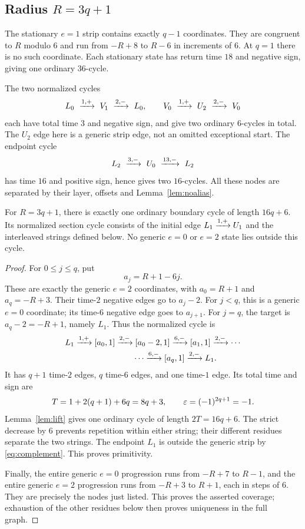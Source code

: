 \subsection{Radius \texorpdfstring{\(R=3q+1\)}{R=3q+1}}

The stationary $e=1$ strip contains exactly $q-1$ coordinates.
They are congruent to $R$ modulo $6$ and run from $-R+8$ to
$R-6$ in increments of $6$. At $q=1$ there is no such
coordinate. Each stationary state has return time $18$ and
negative sign, giving one ordinary $36$-cycle.

The two normalized cycles
\[
 L_0\ \xto{1,+}\ V_1\ \xto{2,-}\ L_0,
 \qquad
 V_0\ \xto{1,+}\ U_2\ \xto{2,-}\ V_0
\]
each have total time $3$ and negative sign, and give two ordinary
$6$-cycles in total. The $U_2$ edge here is a generic strip edge,
not an omitted exceptional start. The endpoint cycle
\[
 L_2\ \xto{3,-}\ U_0\ \xto{13,-}\ L_2
\]
has time $16$ and positive sign, hence gives two $16$-cycles.
All these nodes are separated by their layer, offsets and
Lemma~\ref{lem:noalias}.

\begin{proposition}\label{prop:growing}
For $R=3q+1$, there is exactly one ordinary boundary cycle of
length $16q+6$. Its normalized section cycle consists of the
initial edge $L_1\xrightarrow{1,+}U_1$ and the interleaved strings
defined below. No generic $e=0$ or $e=2$ state lies outside
this cycle.
\end{proposition}
\begin{proof}
For $0\le j\le q$, put
\[
 a_j=R+1-6j.
\]
These are exactly the generic $e=2$ coordinates, with
$a_0=R+1$ and $a_q=-R+3$. Their time-$2$ negative edges
go to $a_j-2$. For $j<q$, this is a generic $e=0$
coordinate; its time-$6$ negative edge goes to $a_{j+1}$.
For $j=q$, the target is $a_q-2=-R+1$, namely $L_1$.
Thus the normalized cycle is
\begin{align*}
 L_1&\xto{1,+}[a_0,1]\xto{2,-}[a_0-2,1]
       \xto{6,-}[a_1,1]\xto{2,-}\cdots\\
    &\hspace{25mm}\cdots\xto{6,-}[a_q,1]
       \xto{2,-}L_1.
\end{align*}
It has $q+1$ time-$2$ edges, $q$ time-$6$ edges, and
one time-$1$ edge. Its total time and sign are
\[
 T=1+2(q+1)+6q=8q+3,\qquad
 \varepsilon=(-1)^{2q+1}=-1.
\]
Lemma~\ref{lem:lift} gives one ordinary cycle of length $2T=16q+6$.
The strict decrease by $6$ prevents repetition within either
string; their different residues separate the two strings.
The endpoint $L_1$ is outside the generic strip by
\eqref{eq:complement}. This proves primitivity.

Finally, the entire generic $e=0$ progression runs from
$-R+7$ to $R-1$, and the entire generic $e=2$ progression
runs from $-R+3$ to $R+1$, each in steps of $6$.
They are precisely the nodes just listed. This proves the
asserted coverage; exhaustion of the other residues below
then proves uniqueness in the full graph.
\end{proof}

